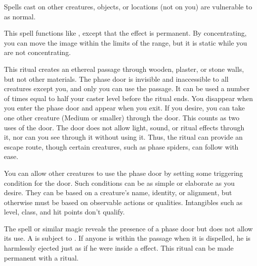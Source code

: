 \begin{spellnotes}
Spells cast on other creatures, objects, or locations (not on you) are vulnerable to  as normal.
\end{spellnotes}

\begin{spelleffect}
This spell functions like , except that the effect is permanent. By concentrating, you can move the image within the limits of the range, but it is static while you are not concentrating.
\end{spelleffect}

\begin{spelleffect}
  This ritual creates an ethereal passage through wooden, plaster, or stone walls, but not other materials. The phase door is invisible and inaccessible to all creatures except you, and only you can use the passage. It can be used a number of times equal to half your caster level before the ritual ends. You disappear when you enter the phase door and appear when you exit. If you desire, you can take one other creature (Medium or smaller) through the door. This counts as two uses of the door. The door does not allow light, sound, or ritual effects through it, nor can you see through it without using it. Thus, the ritual can provide an escape route, though certain creatures, such as phase spiders, can follow with ease.
  \par You can allow other creatures to use the phase door by setting some triggering condition for the door. Such conditions can be as simple or elaborate as you desire. They can be based on a creature's name, identity, or alignment, but otherwise must be based on observable actions or qualities. Intangibles such as level, class, and hit points don't qualify.
\end{spelleffect}
\begin{spellnotes}
  The  spell or similar magic reveals the presence of a phase door but does not allow its use. A  is subject to . If anyone is within the passage when it is dispelled, he is harmlessly ejected just as if he were inside a  effect. This ritual can be made permanent with a  ritual.
\end{spellnotes}


